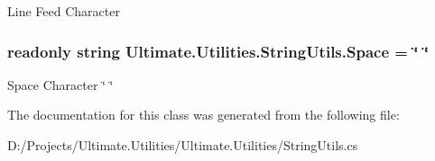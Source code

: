 Line Feed Character \textquotesingle{}~\newline
\textquotesingle{} 

\subsubsection[{\texorpdfstring{Space}{Space}}]{\setlength{\rightskip}{0pt plus 5cm}readonly string Ultimate.\+Utilities.\+String\+Utils.\+Space = \char`\"{} \char`\"{}\hspace{0.3cm}{\ttfamily [static]}}\hypertarget{class_ultimate_1_1_utilities_1_1_string_utils_aaf14285c5b759cf235930277a92fc3b4}{}\label{class_ultimate_1_1_utilities_1_1_string_utils_aaf14285c5b759cf235930277a92fc3b4}


Space Character \char`\"{} \char`\"{} 



The documentation for this class was generated from the following file\+:\begin{DoxyCompactItemize}
\item 
D\+:/\+Projects/\+Ultimate.\+Utilities/\+Ultimate.\+Utilities/String\+Utils.\+cs\end{DoxyCompactItemize}
